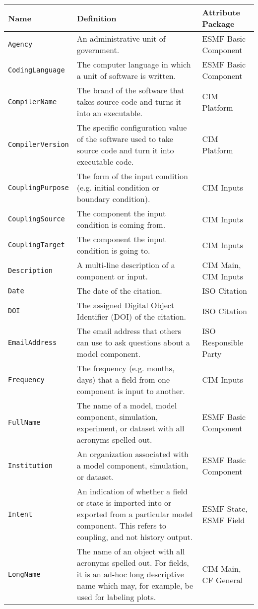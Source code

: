 \begin{longtable}{|p{7cm}|p{5cm}|p{15mm}|}
     \hline\hline
     {\bf Name} & {\bf Definition} & {\bf Attribute Package}\\
     \hline\hline
     {\tt Agency} & An administrative unit of government.& ESMF Basic Component\\
     {\tt CodingLanguage} & The computer language in which a unit of software is written. & ESMF Basic Component\\
     {\tt CompilerName} & The brand of the software that takes source code and turns it into an executable.& CIM Platform\\
     {\tt CompilerVersion} & The specific configuration value of the software used to take source code and turn it into executable code. & CIM Platform\\
     {\tt CouplingPurpose} & The form of the input condition (e.g. initial condition or boundary condition). &  CIM Inputs \\
     {\tt CouplingSource} & The component the input condition is coming from. & CIM Inputs\\
     {\tt CouplingTarget} & The component the input condition is going to. & CIM Inputs\\
     {\tt Description} & A multi-line description of a component or input. & CIM Main, CIM Inputs \\
     {\tt Date} & The date of the citation. & ISO Citation\\
     {\tt DOI} & The assigned Digital Object Identifier (DOI) of the citation. & ISO Citation\\
     {\tt EmailAddress} & The email address that others can use to ask questions about a model component. & ISO Responsible Party\\
     {\tt Frequency} & The frequency (e.g. months, days) that a field from one component is input to another. & CIM Inputs\\
     {\tt FullName} & The name of a model, model component, simulation, experiment, or dataset with all acronyms spelled out.& ESMF Basic Component\\
     {\tt Institution} & An organization associated with a model component, simulation, or dataset.& ESMF Basic Component\\
     {\tt Intent} & An indication of whether a field or state is imported into or exported from a particular model component. This refers to coupling, and not history output. & ESMF State, ESMF Field\\
     {\tt LongName} & The name of an object with all acronyms spelled out. For fields, it is an ad-hoc long descriptive name which may, for example, be used for labeling plots. & CIM Main, CF General\\

\end{longtable}
